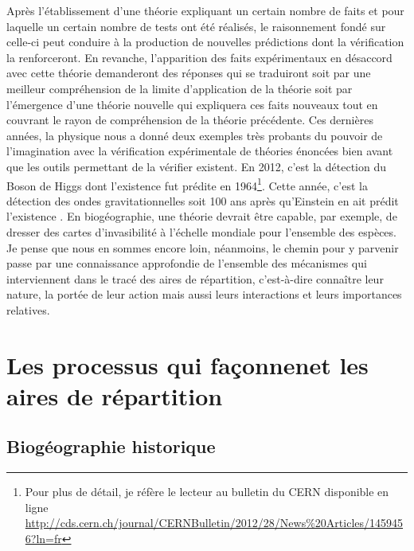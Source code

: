 Après l'établissement d'une théorie expliquant un certain nombre de
faits et pour laquelle un certain nombre de tests ont été réalisés, le
raisonnement fondé sur celle-ci peut conduire à la production de
nouvelles prédictions dont la vérification la renforceront. En revanche,
l'apparition des faits expérimentaux en désaccord avec cette théorie
demanderont des réponses qui se traduiront soit par une meilleur
compréhension de la limite d'application de la théorie soit par
l'émergence d'une théorie nouvelle qui expliquera ces faits nouveaux
tout en couvrant le rayon de compréhension de la théorie précédente. Ces
dernières années, la physique nous a donné deux exemples très probants
du pouvoir de l'imagination avec la vérification expérimentale de
théories énoncées bien avant que les outils permettant de la vérifier
existent. En 2012, c'est la détection du Boson de Higgs dont l'existence
fut prédite en 1964\footnote{Pour plus de détail, je réfère le lecteur
  au bulletin du CERN disponible en ligne
  \url{http://cds.cern.ch/journal/CERNBulletin/2012/28/News\%20Articles/1459456?ln=fr}}.
Cette année, c'est la détection des ondes gravitationnelles soit 100 ans
après qu'Einstein en ait prédit l'existence \citep{Waldrop2016}. En
biogéographie, une théorie devrait être capable, par exemple, de dresser
des cartes d'invasibilité à l'échelle mondiale pour l'ensemble des
espèces. Je pense que nous en sommes encore loin, néanmoins, le chemin
pour y parvenir passe par une connaissance approfondie de l'ensemble des
mécanismes qui interviennent dans le tracé des aires de répartition,
c'est-à-dire connaître leur nature, la portée de leur action mais aussi
leurs interactions et leurs importances relatives.

\section*{Les processus qui façonnenet les aires de
répartition}\label{les-processus-qui-fauxe7onnenet-les-aires-de-ruxe9partition}

\subsection*{Biogéographie
historique}\label{bioguxe9ographie-historique}

